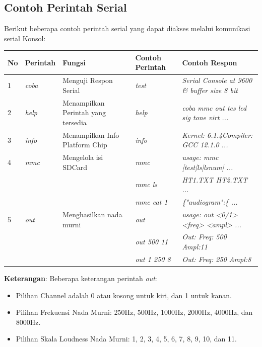 \documentclass[12pt]{book}
\begin{document}
	\newpage
	\subsection{Contoh Perintah Serial}

	Berikut beberapa contoh perintah serial yang dapat diakses melalui komunikasi serial Konsol:

	\begin{table}[!ht]
		\centering
		\begin{tabular}{|l|l|l|l|l|}
			\hline
			\textbf{No} & \textbf{Perintah} & \textbf{Fungsi} & \textbf{Contoh Perintah} & \textbf{Contoh Respon} \\
			\hline
			1 & \textit{coba} & Menguji Respon Serial & \textit{test} & \textit{Serial Console at 9600 \& buffer size 8 bit} \\
			\hline
			2 & \textit{help} & Menampilkan Perintah yang tersedia & \textit{help} & \textit{coba mmc out tes led sig tone virt ...} \\
			\hline
			3 & \textit{info} & Menampilkan Info Platform Chip & \textit{info} & \textit{Kernel: 6.1.4Compiler: GCC 12.1.0 ...} \\
			\hline
			4 & \textit{mmc} & Mengelola isi SDCard & \textit{mmc} & \textit{usage: mmc [test|ls|lsnum| ...} \\
			& & & \textit{mmc ls} & \textit{HT1.TXT HT2.TXT ...} \\
			& & & \textit{mmc cat 1} & \textit{\{"audiogram":\{ ...} \\
			\hline
			5 & \textit{out} & Menghasilkan nada murni &  \textit{out} & \textit{usage: out <0/1> <freq> <ampl> ...} \\
			& & & \textit{out 500 11} & \textit{Out: Freq:  500 Ampl:11} \\
			& & & \textit{out 1 250 8} & \textit{Out: Freq:  250 Ampl:8} \\
			\hline
		\end{tabular}
	\end{table}

	\textbf{Keterangan}: Beberapa keterangan perintah \textit{out}:
	\begin{itemize}
		\item Pilihan Channel adalah 0 atau kosong untuk kiri, dan 1 untuk kanan.
		\item Pilihan Frekuensi Nada Murni: 250Hz, 500Hz, 1000Hz, 2000Hz, 4000Hz, dan 8000Hz.
		\item Pilihan Skala Loudness Nada Murni: 1, 2, 3, 4, 5, 6, 7, 8, 9, 10, dan 11.
	\end{itemize}
\end{document}
